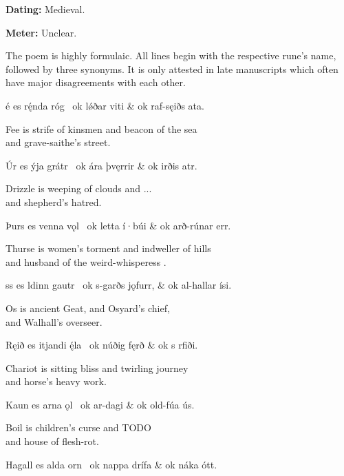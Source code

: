 
\begin{flushright}%
\textbf{Dating:} Medieval.%

\textbf{Meter:} Unclear.
\end{flushright}%

The poem is highly formulaic.  All lines begin with the respective rune’s name, followed by three synonyms.  It is only attested in late manuscripts which often have major disagreements with each other.

\sectionline

\bvg\bva {}é es rę́nda róg \hld\ ok lǿðar viti &
\ind ok raf-sęiðs ata.\eva

\bvb Fee is strife of kinsmen and beacon of the sea \\
and grave-saithe’s  street.\evb\evg


\bvg\bva Úr es ýja grátr \hld\ ok ára þvęrrir &
\ind ok irðis atr.\eva

\bvb Drizzle is weeping of clouds and ... \\
and shepherd’s hatred.\evb\evg


\bvg\bva Þurs es venna vǫl \hld\ ok letta í·búi &
\ind ok arð-rúnar err.\eva

\bvb Thurse is women’s torment and indweller of hills \\
and husband of the weird-whisperess .\evb\evg


\bvg\bva {}ss es ldinn gautr \hld\ ok s-garðs jǫfurr, &
\ind ok al-hallar ísi.\eva

\bvb Os is ancient Geat, and Osyard’s chief, \\
and Walhall’s overseer.\evb\evg


\bvg\bva Ręið es itjandi ę́la \hld\ ok núðig fęrð &
\ind ok s rfiði.\eva

\bvb Chariot is sitting bliss and twirling journey \\
and horse’s heavy work.\evb\evg


\bvg\bva Kaun es arna ǫl \hld\ ok ar-dagi &
\ind ok old-fúa ús.\eva

\bvb Boil is children’s curse and TODO \\
and house of flesh-rot.\evb\evg


\bvg\bva Hagall es alda orn \hld\ ok nappa drífa &
\ind ok náka ótt.\eva

